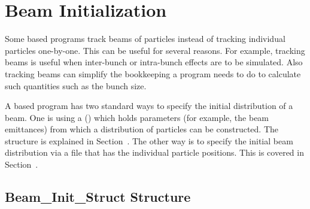 \chapter{Beam Initialization}
\label{c:beam.init}

Some \bmad based programs track beams of particles instead of tracking individual particles
one-by-one. This can be useful for several reasons. For example, tracking beams is useful when
inter-bunch or intra-bunch effects are to be simulated. Also tracking beams can simplify the
bookkeeping a program needs to do to calculate such quantities such as the bunch size.

A \bmad based program has two standard ways to specify the initial distribution of a beam. One is
using a   () which holds parameters (for
example, the beam emittances) from which a distribution of particles can be constructed. The
 structure is explained in Section~. The other way is to
specify the initial beam distribution via a file that has the individual particle positions. This is
covered in Section~.

\section{Beam_Init_Struct Structure}
\label{s:beam.init.struct}

